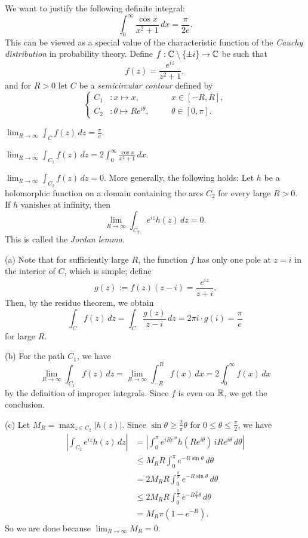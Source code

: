 \documentclass{../note}
\begin{document}
\begin{prb}
We want to justify the following definite integral:
\[\int_0^\infty\frac{\cos x}{x^2+1}\,dx=\frac\pi{2e}.\]
This can be viewed as a special value of the characteristic function of the \emph{Cauchy distribution} in probability theory.
Define $f:\mathbb{C}\setminus\{\pm i\}\to\mathbb{C}$ be such that
\[f(z)=\frac{e^{iz}}{z^2+1},\]
and for $R>0$ let $C$ be a \emph{semicircular contour} defined by
\[\left\{
\begin{alignedat}{2}
C_1&:x\mapsto x,&\quad&x\in[-R,R],\\
C_2&:\theta\mapsto Re^{i\theta},&&\theta\in[0,\pi].
\end{alignedat}
\right.\]
\begin{parts}
\item $\lim_{R\to\infty}\int_Cf(z)\,dz=\frac\pi e$.
\item $\lim_{R\to\infty}\int_{C_1}f(z)\,dz=2\int_0^\infty\frac{\cos x}{x^2+1}\,dx$.
\item $\lim_{R\to\infty}\int_{C_2}f(z)\,dz=0$. More generally, the following holds: Let $h$ be a holomorphic function on a domain containing the arcs $C_2$ for every large $R>0$.
If $h$ vanishes at infinity, then
\[\lim_{R\to\infty}\int_{C_2}e^{iz}h(z)\,dz=0.\]
This is called the \emph{Jordan lemma}.
\end{parts}
\end{prb}
\begin{pf}
(a)
Note that for sufficiently large $R$, the function $f$ has only one pole at $z=i$ in the interior of $C$, which is simple; define
\[g(z):=f(z)(z-i)=\frac{e^{iz}}{z+i}.\]
Then, by the residue theorem, we obtain
\[\int_Cf(z)\,dz=\int_C\frac{g(z)}{z-i}\,dz=2\pi i\cdot g(i)=\frac\pi e\]
for large $R$.

(b)
For the path $C_1$, we have
\[\lim_{R\to\infty}\int_{C_1}f(z)\,dz=\lim_{R\to\infty}\int_{-R}^Rf(x)\,dx=2\int_0^\infty f(x)\,dx\]
by the definition of improper integrals.
Since $f$ is even on $\mathbb{R}$, we get the conclusion.

(c)
Let $M_R=\max_{z\in C_2}|h(z)|$.
Since $\sin\theta\ge\frac2\pi\theta$ for $0\le\theta\le\frac\pi2$, we have
\begin{align*}
|\int_{C_2}e^{iz}h(z)\,dz|
&=|\int_0^\pi e^{iRe^{i\theta}}h(Re^{i\theta})\,iRe^{i\theta}\,d\theta|\\
&\le M_RR\int_0^\pi e^{-R\sin\theta}\,d\theta\\
&=2M_RR\int_0^{\frac\pi2}e^{-R\sin\theta}\,d\theta\\
&\le2M_RR\int_0^{\frac\pi2}e^{-R\frac2\pi\theta}\,d\theta\\\
&=M_R\pi(1-e^{-R}).
\end{align*}
So we are done because $\lim_{R\to\infty}M_R=0$.
\end{pf}
\end{document}

